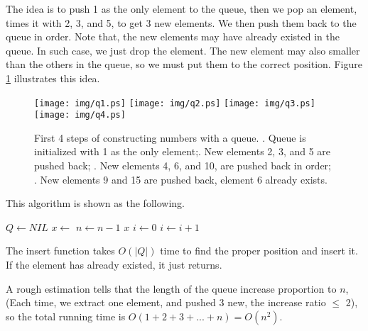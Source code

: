 \documentclass{article}
\begin{document}
The idea is to push 1 as the only element to the queue, then we pop
an element, times it with 2, 3, and 5, to get 3 new elements. We
then push them back to the queue in order. Note that, the new elements may
have already existed in the queue. In such case, we just drop the
element. The new element may also smaller than the others in the queue,
so we must put them to the correct position. Figure \ref{fig:queues}
illustrates this idea.

\begin{figure}[htbp]
       \begin{center}
       	  \texttt{[image: img/q1.ps]}
       	  \texttt{[image: img/q2.ps]}
       	  \texttt{[image: img/q3.ps]}
       	  \texttt{[image: img/q4.ps]}
        \caption{First 4 steps of constructing numbers with a queue. . Queue is initialized with 1 as the only element;. New elements 2, 3, and 5 are pushed back; . New elements 4, 6, and 10, are pushed back in order; . New elements 9 and 15 are pushed back, element 6 already exists.} \label{fig:queues}
       \end{center}
\end{figure}

This algorithm is shown as the following.

\begin{algorithmic}[1]
  \State $Q \gets NIL$
  \State {}
    \State $x \gets$ 
    \State {}
    \State {}
    \State {}
    \State $n \gets n-1$
  \EndWhile
  \State \Return $x$
\EndFunction
\Statex
{}
  \State $i \gets 0$
    \State $i \gets i + 1$
  \EndWhile
    \State \Return
  \EndIf
  \State {}
\EndFunction
\end{algorithmic}

The insert function takes $O(|Q|)$ time to find the proper position and insert
it. If the element has already existed, it just returns.

A rough estimation tells that the length of the queue increase proportion to $n$,
(Each time, we extract one element, and pushed 3 new, the increase ratio $\leq$ 2),
so the total running time is $O(1+2+3+...+n) = O(n^2)$.
\end{document}
